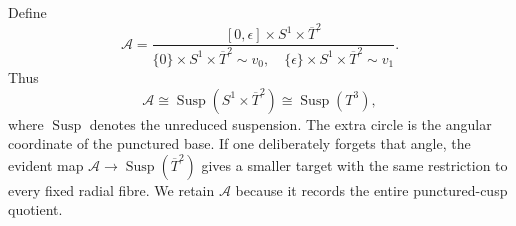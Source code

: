 Define
\begin{equation}
 \mathcal A=
 \frac{[0,\epsilon]\times S^1\times\overline T^2}
 {\{0\}\times S^1\times\overline T^2\sim v_0,\quad
  \{\epsilon\}\times S^1\times\overline T^2\sim v_1}.
 \label{cusp-cone-A-definition}
\end{equation}
Thus
\begin{equation}
 \mathcal A\cong
 \operatorname{Susp}(S^1\times\overline T^2)
 \cong\operatorname{Susp}(T^3),
 \label{cusp-cone-A-suspension}
\end{equation}
where \(\operatorname{Susp}\) denotes the unreduced suspension.  The extra
circle is the angular coordinate of the punctured base.  If one deliberately
forgets that angle, the evident map
\(\mathcal A\to\operatorname{Susp}(\overline T^2)\) gives a smaller target
with the same restriction to every fixed radial fibre.  We retain
\(\mathcal A\) because it records the entire punctured-cusp quotient.

